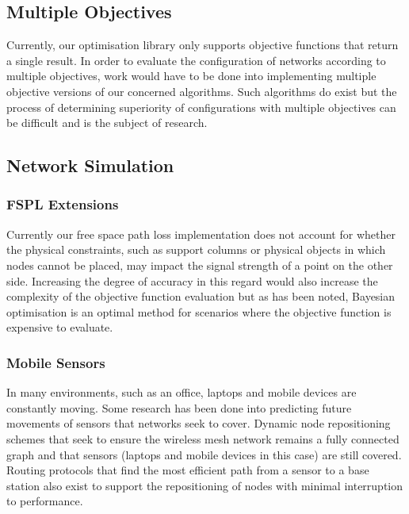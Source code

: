 	\subsection{Multiple Objectives} 
		\label{sec:extensions_multiple_objectives}
		Currently, our optimisation library only supports objective functions that return a single result. In order to evaluate the configuration of networks according to multiple objectives, work would have to be done into implementing multiple objective versions of our concerned algorithms. Such algorithms do exist \cite{demarco2009mogamesh}\cite{younis2020placementsurvey} but the process of determining superiority of configurations with multiple objectives can be difficult and is the subject of research\cite{yoo2007pareto}.
	
	\subsection{Network Simulation}
		\label{sec:extensions_network_sim}
		\subsubsection{FSPL Extensions}
			\label{sec:extensions_FSPL}
			Currently our free space path loss implementation does not account for whether the physical constraints, such as support columns or physical objects in which nodes cannot be placed, may impact the signal strength of a point on the other side. Increasing the degree of accuracy in this regard would also increase the complexity of the objective function evaluation but as has been noted, Bayesian optimisation is an optimal method for scenarios where the objective function is expensive to evaluate.
			
		\subsubsection{Mobile Sensors} 
			\label{sec:extensions_moving_sensors} 
			In many environments, such as an office, laptops and mobile devices are constantly moving. Some research has been done into predicting future movements of sensors that networks seek to cover. Dynamic node repositioning schemes\cite{younis2020placementsurvey} that seek to ensure the wireless mesh network remains a fully connected graph and that sensors (laptops and mobile devices in this case) are still covered. Routing protocols that find the most efficient path from a sensor to a base station also exist to support the repositioning of nodes with minimal interruption to performance\cite{akyildiza47wireless}.
		